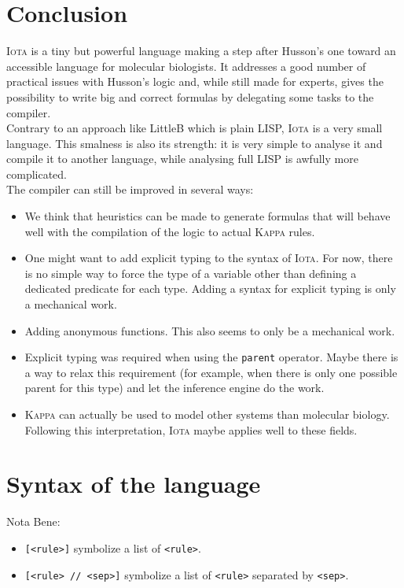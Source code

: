 \documentclass[10pt,a4paper]{article}
\newcommand\Iota{\textsc{Iota}}
\newcommand\Kappa{\textsc{Kappa}}
\newcommand{\ocaml}{\texttt}
\begin{document}
\section{Conclusion}
\Iota{} is a tiny but powerful language making a step after Husson's one toward an accessible language for molecular biologists. It addresses a good number of practical issues with Husson's logic and, while still made for experts, gives the possibility to write big and correct formulas by delegating some tasks to the compiler.\\

Contrary to an approach like LittleB \cite{littleb} which is plain LISP, \Iota{} is a very small language. This smalness is also its strength: it is very simple to analyse it and compile it to another language, while analysing full LISP is awfully more complicated.\\

The compiler can still be improved in several ways:
\begin{itemize}
\item We think that heuristics can be made to generate formulas that will behave well with the compilation of the logic to actual \Kappa{} rules.
\item One might want to add explicit typing to the syntax of \Iota{}. For now, there is no simple way to force the type of a variable other than defining a dedicated predicate for each type. Adding a syntax for explicit typing is only a mechanical work.
\item Adding anonymous functions. This also seems to only be a mechanical work.
\item Explicit typing was required when using the \ocaml{parent} operator. Maybe there is a way to relax this requirement (for example, when there is only one possible parent for this type) and let the inference engine do the work.
\item \Kappa{} can actually be used to model other systems than molecular biology. Following this interpretation, \Iota{} maybe applies well to these fields.
\end{itemize}

\section{Syntax of the language}
Nota Bene:
\begin{itemize}
\item \verb|[<rule>]| symbolize a list of \verb|<rule>|.
\item \verb|[<rule> // <sep>]| symbolize a list of \verb|<rule>| separated by \verb|<sep>|.
\end{itemize}
\end{document}
